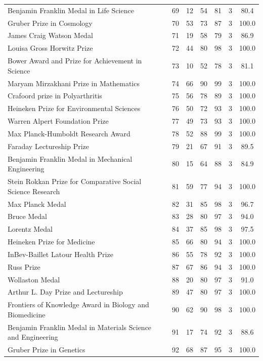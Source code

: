 \begin{longtable}{>{\raggedright\arraybackslash}p{6.6cm}cccccc}
Benjamin Franklin Medal in Life Science & 69 & 12 & 54 & 81 & 3 & 80.4 \\ 
Gruber Prize in Cosmology & 70 & 53 & 73 & 87 & 3 & 100.0 \\ 
James Craig Watson Medal & 71 & 19 & 58 & 79 & 3 & 86.9 \\ 
Louisa Gross Horwitz Prize & 72 & 44 & 80 & 98 & 3 & 100.0 \\ 
Bower Award and Prize for Achievement in Science & 73 & 10 & 52 & 78 & 3 & 81.1 \\ 
Maryam Mirzakhani Prize in Mathematics & 74 & 66 & 90 & 99 & 3 & 100.0 \\ 
Crafoord prize in Polyarthritis & 75 & 56 & 78 & 89 & 3 & 100.0 \\ 
Heineken Prize for Environmental Sciences & 76 & 50 & 72 & 93 & 3 & 100.0 \\ 
Warren Alpert Foundation Prize & 77 & 49 & 73 & 93 & 3 & 100.0 \\ 
Max Planck-Humboldt Research Award & 78 & 52 & 88 & 99 & 3 & 100.0 \\ 
Faraday Lectureship Prize & 79 & 21 & 67 & 91 & 3 & 89.5 \\ 
Benjamin Franklin Medal in Mechanical Engineering & 80 & 15 & 64 & 88 & 3 & 84.9 \\ 
Stein Rokkan Prize for Comparative Social Science Research & 81 & 59 & 77 & 94 & 3 & 100.0 \\ 
Max Planck Medal & 82 & 31 & 85 & 98 & 3 & 96.7 \\ 
Bruce Medal & 83 & 28 & 80 & 97 & 3 & 94.0 \\ 
Lorentz Medal & 84 & 37 & 85 & 98 & 3 & 97.5 \\ 
Heineken Prize for Medicine & 85 & 66 & 80 & 94 & 3 & 100.0 \\ 
InBev-Baillet Latour Health Prize & 86 & 55 & 78 & 92 & 3 & 100.0 \\ 
Russ Prize & 87 & 67 & 86 & 94 & 3 & 100.0 \\ 
Wollaston Medal & 88 & 20 & 80 & 97 & 3 & 91.0 \\ 
Arthur L. Day Prize and Lectureship & 89 & 47 & 80 & 97 & 3 & 100.0 \\ 
Frontiers of Knowledge Award in Biology and Biomedicine & 90 & 62 & 90 & 98 & 3 & 100.0 \\ 
Benjamin Franklin Medal in Materials Science and Engineering & 91 & 17 & 74 & 92 & 3 & 88.6 \\ 
Gruber Prize in Genetics & 92 & 68 & 87 & 95 & 3 & 100.0 \\ 

\end{longtable}
